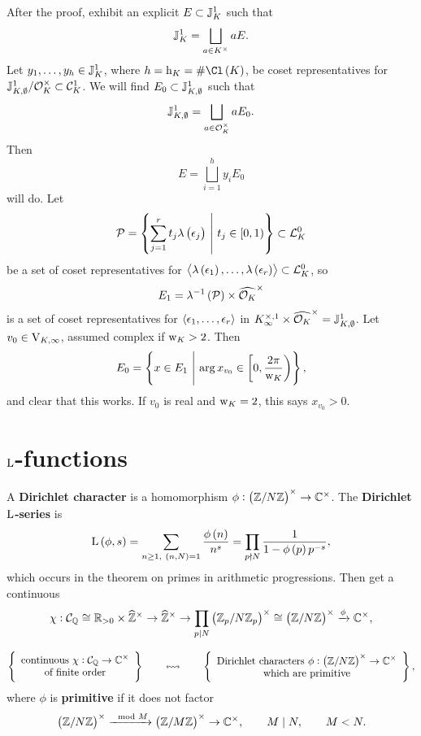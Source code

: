 After the proof, exhibit an explicit $ E \subset \mathbb{J}_K^1 $ such that
$$ \mathbb{J}_K^1 = \bigsqcup_{a \in K^\times} aE. $$
Let $ y_1, \dots, y_h \in \mathbb{J}_K^1 $, where $ h = \h_K = \#\Cl\br{K} $, be coset representatives for $ \mathbb{J}_{K, \emptyset}^1 / \mathcal{O}_K^\times \subset \mathcal{C}_K^1 $. We will find $ E_0 \subset \mathbb{J}_{K, \emptyset}^1 $ such that
$$ \mathbb{J}_{K, \emptyset}^1 = \bigsqcup_{a \in \mathcal{O}_K^\times} aE_0. $$
Then
$$ E = \bigsqcup_{i = 1}^h y_iE_0 $$
will do. Let
$$ \PPP = \cbr{\sum_{j = 1}^r t_j\lambda\br{\epsilon_j} \st t_j \in \intco{0, 1}} \subset \LLL_K^0 $$
be a set of coset representatives for $ \abr{\lambda\br{\epsilon_1}, \dots, \lambda\br{\epsilon_r}} \subset \LLL_K^0 $, so
$$ E_1 = \lambda^{-1}\br{\PPP} \times \widehat{\OOO_K}^\times $$
is a set of coset representatives for $ \left\langle \epsilon_1, \dots, \epsilon_r \right\rangle $ in $ K_\infty^{\times, 1} \times \widehat{\mathcal{O}_K}^\times = \mathbb{J}_{K, \emptyset}^1 $. Let $ v_0 \in \mathrm{V}_{K, \infty} $, assumed complex if $ \mathrm{w}_K > 2 $. Then
$$ E_0 = \cbr{x \in E_1 \st \arg x_{v_0} \in \intco{0, \dfrac{2\pi}{\w_K}}}, $$
and clear that this works. If $ v_0 $ is real and $ \mathrm{w}_K = 2 $, this says $ x_{v_0} > 0 $.

\pagebreak

\section{\texorpdfstring{$ \mathrm{L} $}{L}-functions}

\begin{example*}
A \textbf{Dirichlet character} is a homomorphism $ \phi : \br{\ZZ / N\ZZ}^\times \to \CC^\times $. The \textbf{Dirichlet $ \mathrm{L} $-series} is
$$ \L\br{\phi, s} = \sum_{n \ge 1, \ \br{n, N} = 1} \dfrac{\phi\br{n}}{n^s} = \prod_{p \nmid N} \dfrac{1}{1 - \phi\br{p}p^{-s}}, $$
which occurs in the theorem on primes in arithmetic progressions. Then get a continuous
$$ \chi : \CCC_\QQ \cong \RR_{> 0} \times \widehat{\ZZ}^\times \to \widehat{\ZZ}^\times \to \prod_{p \mid N} \br{\ZZ_p / N\ZZ_p}^\times \cong \br{\ZZ / N\ZZ}^\times \xrightarrow{\phi} \CC^\times, $$
\end{example*}

\begin{exercise*}
$$ \correspondence{\text{continuous} \ \chi : \CCC_\QQ \to \CC^\times \\ \text{of finite order}}{\text{Dirichlet characters} \ \phi : \br{\ZZ / N\ZZ}^\times \to \CC^\times \\ \text{which are primitive}}, $$
where $ \phi $ is \textbf{primitive} if it does not factor
$$ \br{\ZZ / N\ZZ}^\times \xrightarrow{\mod M} \br{\ZZ / M\ZZ}^\times \to \CC^\times, \qquad M \mid N, \qquad M < N. $$
\end{exercise*}

